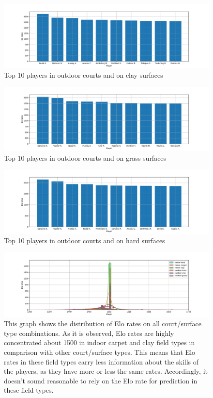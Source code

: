 \documentclass[preprint,aps,nofootinbib,a4paper,superscriptaddress,longbibliography,amsfonts,amssymb,amsmath,titlepage]{revtex4-2}
\begin{document}
%
%
\begin{figure}[h]
\includegraphics[width=\textwidth]{pictures/top-10-elo-rates-outdoor-clay.pdf}
\caption{Top 10 players in outdoor courts and on clay surfaces}
\label{top-10-elo-rates-outdoor-clay}
\end{figure}
%
%
\begin{figure}[h]
\includegraphics[width=\textwidth]{pictures/top-10-elo-rates-outdoor-grass.pdf}
\caption{Top 10 players in outdoor courts and on grass surfaces}
\label{top-10-elo-rates-outdoor-grass}
\end{figure}
%
%
\begin{figure}[h]
\includegraphics[width=\textwidth]{pictures/top-10-elo-rates-outdoor-hard.pdf}
\caption{Top 10 players in outdoor courts and on hard surfaces}
\label{top-10-elo-rates-outdoor-hard}
\end{figure}
%
%
\begin{figure}[h]
\includegraphics[width=\textwidth]{pictures/elo-rate-field-type-dist.pdf}
\caption{This graph shows the distribution of Elo rates on all court/surface type combinations. As it is observed, Elo rates are highly concentrated about 1500 in indoor carpet and clay field types in comparison with other court/surface types. This means that Elo rates in these field types carry less information about the skills of the players, as they have more or less the same rates. Accordingly, it doesn't sound reasonable to rely on the Elo rate for prediction in these field types.}
\label{elo-rate-field-type-dist}
\end{figure}
%
\end{document}
